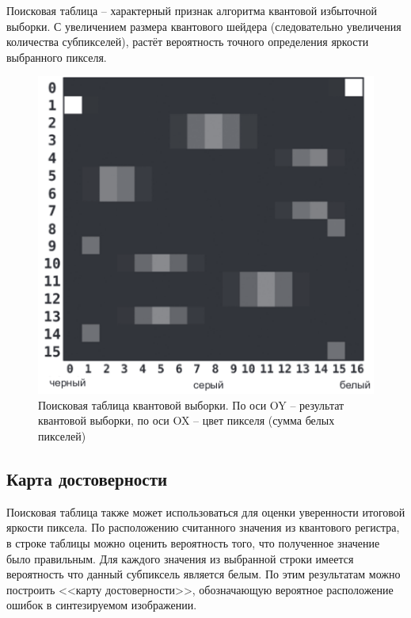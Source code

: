 Поисковая таблица -- характерный признак алгоритма квантовой избыточной выборки. С увеличением размера квантового шейдера (следовательно увеличения количества субпикселей), растёт вероятность точного определения яркости выбранного пикселя.

\begin{figure}[H]
	\begin{center}
		\includegraphics[scale=0.55]{img/qss_table.png}
	\end{center}
	\captionsetup{justification=centering}
	\caption{Поисковая таблица квантовой выборки. По оси OY -- результат квантовой выборки, по оси OX -- цвет пикселя (сумма белых пикселей)}
	\label{img:qss_table}
\end{figure}

\subsection{Карта достоверности}

Поисковая таблица также может использоваться для оценки уверенности итоговой яркости пиксела. По расположению считанного значения из квантового регистра, в строке таблицы можно оценить вероятность того, что полученное значение было правильным. Для каждого значения из выбранной строки имеется вероятность что данный субпиксель является белым. По этим результатам можно построить <<карту достоверности>>, обозначающую вероятное расположение ошибок в синтезируемом изображении.

